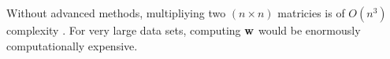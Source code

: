 \documentclass[11pt]{article}
\begin{document}
\begin{enumerate}[start=1,label={\bfseries Question \arabic*:},leftmargin=1in]
        Without advanced methods, multipliying two \((n\times n)\) matricies is of \(O(n^3)\) complexity \cite{matrixcompute}. For very large data sets, computing \(\vb{w}\) would be enormously computationally expensive.

\end{enumerate}



\end{document}
